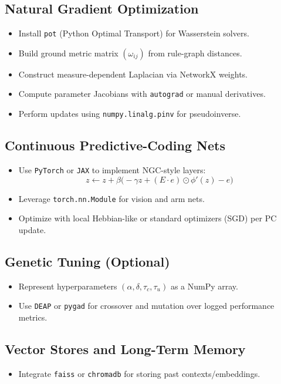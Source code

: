 \documentclass[11pt]{article}
\begin{document}
\subsection{Natural Gradient Optimization}
\begin{itemize}
  \item Install \texttt{pot} (Python Optimal Transport) for Wasserstein solvers.
  \item Build ground metric matrix $(\omega_{ij})$ from rule-graph distances.
  \item Construct measure-dependent Laplacian via NetworkX weights.
  \item Compute parameter Jacobians with \texttt{autograd} or manual derivatives.
  \item Perform updates using \texttt{numpy.linalg.pinv} for pseudoinverse.
\end{itemize}

\subsection{Continuous Predictive-Coding Nets}
\begin{itemize}
  \item Use \texttt{PyTorch} or \texttt{JAX} to implement NGC-style layers:
  \[
    z \leftarrow z + \beta\bigl(-\gamma z + (E\cdot e)\odot \phi'(z) - e\bigr)
  \]
  \item Leverage \texttt{torch.nn.Module} for vision and arm nets.
  \item Optimize with local Hebbian-like or standard optimizers (SGD) per PC update.
\end{itemize}

\subsection{Genetic Tuning (Optional)}
\begin{itemize}
  \item Represent hyperparameters $(\alpha,\delta,\tau_c,\tau_u)$ as a NumPy array.
  \item Use \texttt{DEAP} or \texttt{pygad} for crossover and mutation over logged performance metrics.
\end{itemize}

\subsection{Vector Stores and Long-Term Memory}
\begin{itemize}
  \item Integrate \texttt{faiss} or \texttt{chromadb} for storing past contexts/embeddings.
\end{itemize}
\end{document}
